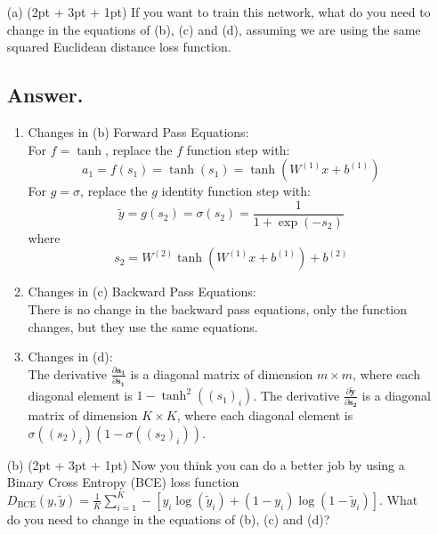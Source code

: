 \documentclass{article}
\begin{document}
\begin{itemize}
    \item[(a)] (2pt + 3pt + 1pt) If you want to train this network, what do you need to change in the equations of (b), (c) and (d), assuming we are using the same squared Euclidean distance loss function.
    \subsection*{Answer.}
    \begin{enumerate}
        \item{Changes in (b) Forward Pass Equations:}\\
        For $f = \tanh$, replace the $f$ function step with:
        \[ a_1 = f(s_1) = \tanh(s_1) = \tanh(W^{(1)}x + b^{(1)}) \]
        For \(g = \sigma\), replace the \(g\) identity function step with:
        \[ \tilde{y} = g(s_2) = \sigma(s_2) = \frac{1}{1 + \exp(-s_2)}  \]
        where \[s_2 = W^{(2)}\tanh(W^{(1)}x + b^{(1)}) + b^{(2)}\]
        \item {Changes in (c) Backward Pass Equations:} \\
        There is no change in the backward pass equations, only the function changes, but they use the same equations.
        \item{Changes in (d):}\\
        The derivative \( \frac{\partial \boldsymbol{a_1}}{\partial \boldsymbol{s_1}} \) is a diagonal matrix of dimension \( m \times m \), where each diagonal element is \( 1-\tanh^2((s_1)_i) \).
        The derivative \( \frac{\partial \boldsymbol{\tilde{y}}}{\partial \boldsymbol{s_2}} \) is a diagonal matrix of dimension \( K \times K \), where each diagonal element is \( \sigma((s_2)_i)(1 - \sigma((s_2)_i)) \).

    \end{enumerate}



    
    \item[(b)] (2pt + 3pt + 1pt) Now you think you can do a better job by using a Binary Cross Entropy (BCE) loss function $D_{\text{BCE}}(y, \tilde{y}) = \frac{1}{K} \sum_{i=1}^{K} -[y_i \log(\tilde{y}_i) + (1 - y_i) \log(1 - \tilde{y}_i)]$. What do you need to change in the equations of (b), (c) and (d)?

\end{itemize}
\end{document}

